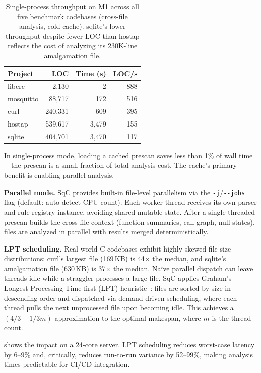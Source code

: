 \begin{table}[t]
\centering
\footnotesize
\begin{tabular}{@{}lrrr@{}}
\toprule
\textbf{Project} & \textbf{LOC} & \textbf{Time (s)} & \textbf{LOC/s} \\
\midrule
libcrc    &   2{,}130 &     2 &   888 \\
mosquitto &  88{,}717 &   172 &   516 \\
curl      & 240{,}331 &   609 &   395 \\
hostap    & 539{,}617 & 3{,}479 & 155 \\
sqlite    & 404{,}701 & 3{,}470 & 117 \\
\bottomrule
\end{tabular}
\caption{Single-process throughput on M1 across all five benchmark
codebases (cross-file analysis, cold cache).  sqlite's lower
throughput despite fewer LOC than hostap reflects the cost of
analyzing its 230K-line amalgamation file.}
\label{tab:runtime-scaling}
\end{table}

In single-process mode, loading a cached prescan saves less than 1\%
of wall time---the prescan is a small fraction of total analysis cost.
The cache's primary benefit is enabling parallel analysis.

\textbf{Parallel mode.}  SqC provides built-in file-level parallelism
via the \texttt{-j}/\texttt{-{}-jobs} flag (default: auto-detect CPU
count).  Each worker thread receives its own parser and rule registry
instance, avoiding shared mutable state.  After a single-threaded
prescan builds the cross-file context (function summaries, call graph,
null states), files are analyzed in parallel with results merged
deterministically.

\textbf{LPT scheduling.}  Real-world C codebases exhibit highly skewed
file-size distributions: curl's largest file (169\,KB) is 44$\times$
the median, and sqlite's amalgamation file (630\,KB) is 37$\times$ the
median.  Na\"ive parallel dispatch can leave threads idle while a
straggler processes a large file.  SqC applies Graham's
Longest-Processing-Time-first (LPT) heuristic~\cite{graham-lpt}: files
are sorted by size in descending order and dispatched via demand-driven
scheduling, where each thread pulls the next unprocessed file upon
becoming idle.  This achieves a $(4/3 - 1/3m)$-approximation to the
optimal makespan, where $m$ is the thread count.

 shows the impact on a 24-core server.  LPT
scheduling reduces worst-case latency by 6--9\% and, critically,
reduces run-to-run variance by 52--99\%, making analysis times
predictable for CI/CD integration.


